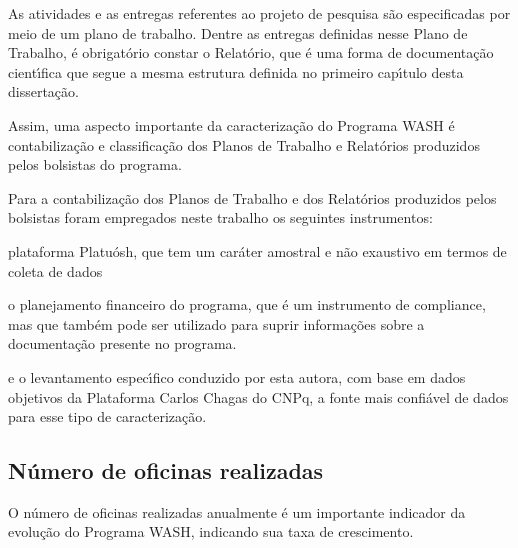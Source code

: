\documentclass[
12pt,		%
openright,	%
twoside,  %
a4paper,			%
chapter=TITLE,		%
english,			%
french,				%
spanish,			%
brazil				%
]{USPSC-classe/USPSC}
\begin{document}
As atividades e as entregas referentes ao projeto de pesquisa s\~ao especificadas por meio de um plano de trabalho. Dentre as entregas definidas nesse Plano de Trabalho, \'e obrigat\'orio constar o Relat\'orio, que \'e uma forma de documenta\c{c}\~ao cient\'{\i}fica que segue a mesma estrutura definida no primeiro cap\'{\i}tulo desta disserta\c{c}\~ao.











Assim, uma aspecto importante da caracteriza\c{c}\~ao do Programa WASH \'e contabiliza\c{c}\~ao e classifica\c{c}\~ao dos Planos de Trabalho e Relat\'orios produzidos pelos bolsistas do programa.










Para a contabiliza\c{c}\~ao dos Planos de Trabalho e dos Relat\'orios produzidos pelos bolsistas foram empregados neste trabalho os seguintes instrumentos:











\begin{alineas}
\item plataforma Platu\'osh, que tem um car\'ater amostral e n\~ao exaustivo em termos de coleta de dados
\item o planejamento financeiro do programa, que \'e um instrumento de compliance, mas que tamb\'em pode ser utilizado para suprir informa\c{c}\~oes sobre a documenta\c{c}\~ao presente no programa.
\item e o levantamento espec\'{\i}fico conduzido por esta autora, com base em dados objetivos da Plataforma Carlos Chagas do CNPq, a fonte mais confi\'avel de dados para esse tipo de caracteriza\c{c}\~ao.
\end{alineas}

\subsection[N\'umero de oficinas realizadas]{N\'umero de oficinas realizadas}\label{N\'umero de oficinas realizadas}
O n\'umero de oficinas realizadas anualmente \'e um importante indicador da evolu\c{c}\~ao do Programa WASH, indicando sua taxa de crescimento.
\end{document}
